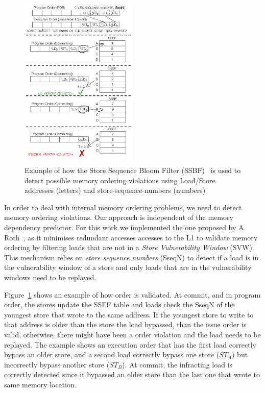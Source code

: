 \documentclass{sig-alternate}
\begin{document}
\begin{figure}[ht]
\centerline{\includegraphics[width=0.50\textwidth]{diagrams/MemOrdValidation.pdf}}
\caption{Example of how the Store Sequence Bloom Filter (SSBF)~\cite{SVW/roth05} is used to detect possible memory ordering violations using Load/Store addresses (letters) and store-sequence-numbers (numbers)}
\label{fig:MemOrdValidation}
\end{figure}

In order to deal with internal memory ordering problems, we need to detect memory ordering violations. Our approach is independent of the memory dependency predictor. For this work we implemented the one proposed by A. Roth~\cite{SVW/roth05}, as it minimises redundant accesses accesses to the L1 to validate memory ordering by filtering loads that are not in a \textit{Store Vulnerability Window} (SVW). This mechanism relies on \textit{store sequence numbers} (SseqN) to detect if a load is in the vulnerability window of a store and only loads that are in the vulnerability windows need to be replayed. 

Figure~\ref{fig:MemOrdValidation} shows an example of how order is validated. At commit, and in program order, the stores update the SSFF table and loads check the SseqN of the youngest store that wrote to the same address. If the youngest store to write to that address is older than the store the load bypassed, than the issue order is valid, otherwise, there might have been a order violation and the load needs to be replayed. 
The example shows an execution order that has the first load correctly bypass an older store, and a second load correctly bypass one store (\(ST_A\)) but incorrectly bypass another store (\(ST_B\)). At commit, the infracting load is correctly detected since it bypassed an older store than the last one that wrote to same memory location.
 
\end{document}
